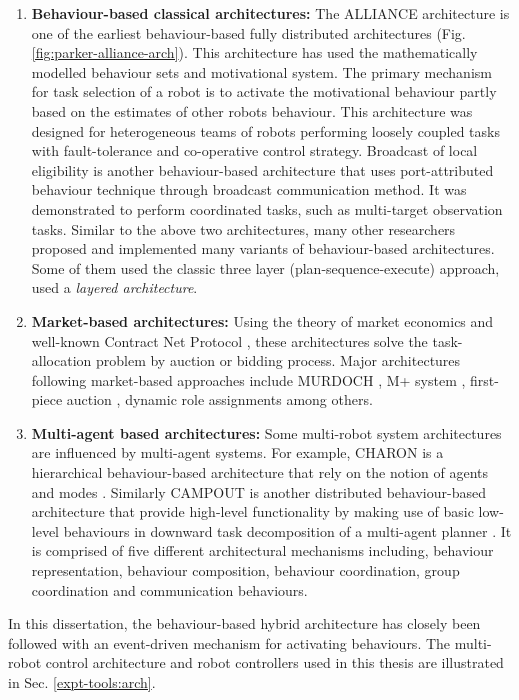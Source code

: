 \begin{enumerate}
\item \textbf{Behaviour-based classical architectures: }
The ALLIANCE architecture \cite{Parker1998} is one of the earliest behaviour-based fully distributed architectures (Fig. \ref{fig:parker-alliance-arch}). This architecture has used the mathematically modelled behaviour sets and motivational system. The primary mechanism for task selection of a robot is to activate the motivational behaviour partly based on the estimates of other robots behaviour. This architecture was designed for heterogeneous teams of robots performing loosely coupled tasks with fault-tolerance and co-operative control strategy. Broadcast of local eligibility  \cite{Werger2001} is another behaviour-based architecture that uses port-attributed behaviour technique through broadcast communication method. It was demonstrated to perform coordinated tasks, such as multi-target observation tasks. Similar to the above two architectures, many other researchers proposed and implemented many variants of behaviour-based architectures. Some of them used the classic three layer (plan-sequence-execute) approach, \cite{Simmons+2002} used a {\em layered architecture}.
%
\item \textbf{Market-based architectures: }
Using the theory of market economics and well-known Contract Net Protocol \cite{Davis1988+}, these architectures solve the task-allocation problem by auction or bidding process. Major architectures following market-based approaches include MURDOCH \cite{Gerkey+2002}, M+ system \cite{Botelho+1999}, first-piece auction \cite{Zlot+2002}, dynamic role assignments \cite{Chaimowicz2002} among others.
%
\item \textbf{Multi-agent based architectures: }
Some multi-robot system architectures are influenced by multi-agent systems. For example, CHARON is a hierarchical behaviour-based architecture that rely on the notion of agents and modes \cite{Chaimowicz2002}. Similarly CAMPOUT is another distributed behaviour-based architecture that provide high-level functionality by making use of basic low-level behaviours in downward task decomposition of a multi-agent planner \cite{Huntsberger+2003}. It is comprised of five different architectural mechanisms including, behaviour representation, behaviour composition, behaviour coordination, group coordination and communication behaviours.
\end{enumerate}
In this dissertation, the behaviour-based hybrid architecture has closely been followed with an event-driven mechanism for activating behaviours. The multi-robot control architecture and robot controllers used in this thesis are illustrated in Sec. \ref{expt-tools:arch}.
